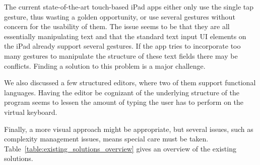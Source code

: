 The current state-of-the-art touch-based iPad apps either only use the single tap gesture, thus wasting a golden opportunity, or use several gestures without concern for the usability of them. 
The issue seems to be that they are all essentially manipulating text and that the standard text input UI elements on the iPad already support several gestures. 
If the app tries to incorporate too many gestures to manipulate the structure of these text fields there may be conflicts. 
Finding a solution to this problem is a major challenge.

We also discussed a few structured editors, where two of them support functional languages. 
Having the editor be cognizant of the underlying structure of the program seems to lessen the amount of typing the user has to perform on the virtual keyboard. 

Finally, a more visual approach might be appropriate, but several issues, such as complexity management issues, means special care must be taken.
Table~\ref{table:existing_solutions_overview} gives an overview of the existing solutions.
